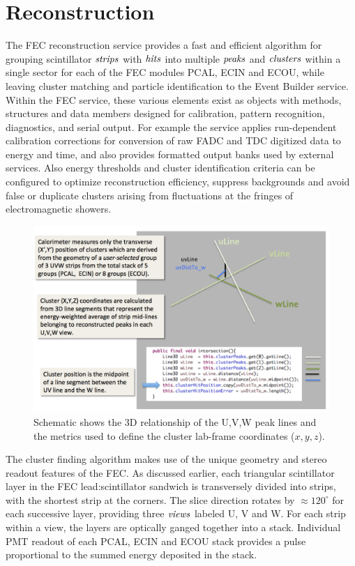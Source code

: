 \section{Reconstruction}

The FEC reconstruction service provides a fast and efficient algorithm for grouping scintillator $\it{strips}$ with $\it{hits}$ into multiple $\it{peaks}$ and $\it{clusters}$ within a single sector for each of the FEC modules PCAL, ECIN and ECOU, while leaving cluster matching and particle identification to the Event Builder service.  Within the FEC service, these various elements exist as objects with methods, structures and data members designed for calibration, pattern recognition, diagnostics, and serial output.  For example the service applies run-dependent calibration corrections for conversion of raw FADC and TDC digitized data to energy and time, and also provides formatted output banks used by external services.  Also energy thresholds and cluster identification criteria can be configured to optimize reconstruction efficiency, suppress backgrounds and avoid false or duplicate clusters arising from fluctuations at the fringes of electromagnetic showers. 

\begin{figure}[hbt]
\centering
\includegraphics[width=0.95\columnwidth,keepaspectratio]{img/S6_0.png}
\caption{Schematic shows the 3D relationship of the U,V,W peak lines and the metrics used to define the cluster lab-frame coordinates ($x,y,z$).}
\label{fig:S6_0}
\end{figure}

The cluster finding algorithm makes use of the unique geometry and stereo readout features of the FEC. As discussed earlier, each triangular scintillator layer in the FEC lead:scintillator sandwich is transversely divided into strips, with the shortest strip at the corners. The slice direction rotates by $\approx 120^{\circ}$ for each successive layer, providing three $\it{views}$ labeled U, V and W.  For each strip within a view, the layers are optically ganged together into a stack.  Individual PMT readout of each PCAL, ECIN and ECOU stack provides a pulse proportional to the summed energy deposited in the stack.

